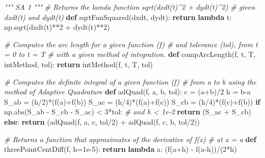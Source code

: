 \documentclass[11pt]{article}
\newenvironment{Shaded}{}{}
\newcommand{\KeywordTok}[1]{\textcolor[rgb]{0.00,0.44,0.13}{\textbf{{#1}}}}
\newcommand{\DecValTok}[1]{\textcolor[rgb]{0.25,0.63,0.44}{{#1}}}
\newcommand{\FloatTok}[1]{\textcolor[rgb]{0.25,0.63,0.44}{{#1}}}
\newcommand{\CommentTok}[1]{\textcolor[rgb]{0.38,0.63,0.69}{\textit{{#1}}}}
\newcommand{\NormalTok}[1]{{#1}}
\newcommand{\ControlFlowTok}[1]{\textcolor[rgb]{0.00,0.44,0.13}{\textbf{{#1}}}}
\newcommand{\OperatorTok}[1]{\textcolor[rgb]{0.40,0.40,0.40}{{#1}}}
\newcommand{\BuiltInTok}[1]{{#1}}
\begin{document}
\begin{Shaded}
\begin{Highlighting}[]
\CommentTok{""" SA 1 """}
\CommentTok{# Returns the lamda function sqrt(dxdt(t)^2 + dydt(t)^2)}
\CommentTok{# given dxdt(t) and dydt(t)}
\KeywordTok{def}\NormalTok{ sqrtFunSquared(dxdt, dydt):}
    \ControlFlowTok{return} \KeywordTok{lambda}\NormalTok{ t: np.sqrt(dxdt(t)}\OperatorTok{**}\DecValTok{2} \OperatorTok{+}\NormalTok{ dydt(t)}\OperatorTok{**}\DecValTok{2}\NormalTok{)}

\CommentTok{# Computes the arc length for a given function (f)}
\CommentTok{# and tolerance (tol), from t = 0 to t = T}
\CommentTok{# with a given method of integration. }
\KeywordTok{def}\NormalTok{ compArcLength(f, t, T, intMethod, tol):}
    \ControlFlowTok{return}\NormalTok{ intMethod(f, t, T, tol)}

\CommentTok{# Computes the definite integral of a given function (f)}
\CommentTok{# from a to b using the method of Adaptive Quadrature}
\KeywordTok{def}\NormalTok{ adQuad(f, a, b, tol):}
\NormalTok{    c }\OperatorTok{=}\NormalTok{ (a}\OperatorTok{+}\NormalTok{b)}\OperatorTok{/}\DecValTok{2}
\NormalTok{    h }\OperatorTok{=}\NormalTok{ b}\OperatorTok{-}\NormalTok{a}
\NormalTok{    S_ab }\OperatorTok{=}\NormalTok{ (h}\OperatorTok{/}\DecValTok{2}\NormalTok{)}\OperatorTok{*}\NormalTok{(f(a)}\OperatorTok{+}\NormalTok{f(b))}
\NormalTok{    S_ac }\OperatorTok{=}\NormalTok{ (h}\OperatorTok{/}\DecValTok{4}\NormalTok{)}\OperatorTok{*}\NormalTok{(f(a)}\OperatorTok{+}\NormalTok{f(c))}
\NormalTok{    S_cb }\OperatorTok{=}\NormalTok{ (h}\OperatorTok{/}\DecValTok{4}\NormalTok{)}\OperatorTok{*}\NormalTok{(f(c)}\OperatorTok{+}\NormalTok{f(b))}
    \ControlFlowTok{if}\NormalTok{ np.}\BuiltInTok{abs}\NormalTok{(S_ab }\OperatorTok{-}\NormalTok{ S_cb }\OperatorTok{-}\NormalTok{ S_ac) }\OperatorTok{<} \DecValTok{3}\OperatorTok{*}\NormalTok{tol: }\CommentTok{#  and h < 1e-2}
        \ControlFlowTok{return}\NormalTok{ (S_ac }\OperatorTok{+}\NormalTok{ S_cb)}
    \ControlFlowTok{else}\NormalTok{:}
        \ControlFlowTok{return}\NormalTok{ (adQuad(f, a, c, tol}\OperatorTok{/}\DecValTok{2}\NormalTok{) }\OperatorTok{+}\NormalTok{ adQuad(f, c, b, tol}\OperatorTok{/}\DecValTok{2}\NormalTok{))}

\CommentTok{# Returns a function that approximates of the derivative of f(x)}
\CommentTok{# at x = a}
\KeywordTok{def}\NormalTok{ threePointCentDiff(f, h}\OperatorTok{=}\FloatTok{1e-5}\NormalTok{):}
    \ControlFlowTok{return} \KeywordTok{lambda}\NormalTok{ a: (f(a}\OperatorTok{+}\NormalTok{h) }\OperatorTok{-}\NormalTok{ f(a}\OperatorTok{-}\NormalTok{h))}\OperatorTok{/}\NormalTok{(}\DecValTok{2}\OperatorTok{*}\NormalTok{h)}


\end{Highlighting}
\end{Shaded}
\end{document}
